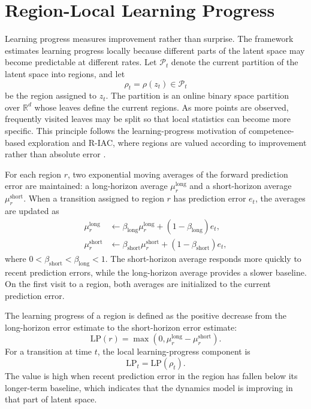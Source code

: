 \section{Region-Local Learning Progress}
\label{sec:region_local_learning_progress}

Learning progress measures improvement rather than surprise.
The framework estimates learning progress locally because different parts of the latent space may become predictable at different rates.
Let $\mathcal{P}_t$ denote the current partition of the latent space into regions, and let
\begin{equation}
    \rho_t=\rho(z_t)\in\mathcal{P}_t
\end{equation}
be the region assigned to $z_t$.
The partition is an online binary space partition over $\mathbb{R}^{d}$ whose leaves define the current regions.
As more points are observed, frequently visited leaves may be split so that local statistics can become more specific.
This principle follows the learning-progress motivation of competence-based exploration and R-IAC, where regions are valued according to improvement rather than absolute error \parencite{schmidhuber-1991,baranes-2009}.

For each region $r$, two exponential moving averages of the forward prediction error are maintained: a long-horizon average $\mu_r^{\mathrm{long}}$ and a short-horizon average $\mu_r^{\mathrm{short}}$.
When a transition assigned to region $r$ has prediction error $e_t$, the averages are updated as
\begin{align}
    \mu_r^{\mathrm{long}}
    &\leftarrow
    \beta_{\mathrm{long}}\mu_r^{\mathrm{long}}
    +(1-\beta_{\mathrm{long}})e_t, \\
    \mu_r^{\mathrm{short}}
    &\leftarrow
    \beta_{\mathrm{short}}\mu_r^{\mathrm{short}}
    +(1-\beta_{\mathrm{short}})e_t,
\end{align}
where $0<\beta_{\mathrm{short}}<\beta_{\mathrm{long}}<1$.
The short-horizon average responds more quickly to recent prediction errors, while the long-horizon average provides a slower baseline.
On the first visit to a region, both averages are initialized to the current prediction error.

The learning progress of a region is defined as the positive decrease from the long-horizon error estimate to the short-horizon error estimate:
\begin{equation}
    \mathrm{LP}(r)
    = \max\!\left(0,\mu_r^{\mathrm{long}}-\mu_r^{\mathrm{short}}\right).
    \label{eq:region_learning_progress}
\end{equation}
For a transition at time $t$, the local learning-progress component is
\begin{equation}
    \mathrm{LP}_t=\mathrm{LP}(\rho_t).
\end{equation}
The value is high when recent prediction error in the region has fallen below its longer-term baseline, which indicates that the dynamics model is improving in that part of latent space.

